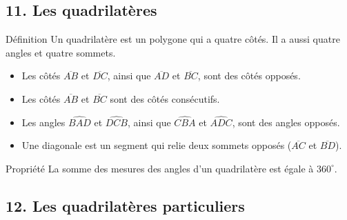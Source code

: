 \newpage
\subsection*{11. Les quadrilatères}

\begin{regle}{Définition}
Un \textcolor{themeColor}{quadrilatère} est un \textcolor{themeColor}{polygone} qui a quatre côtés. Il a aussi quatre angles et quatre sommets.
\end{regle}

\begin{center}
\end{center}

\begin{itemize}[leftmargin=*, itemsep=2pt, topsep=2pt, label=$\triangleright$]
    \item Les côtés $\overline{AB}$ et $\overline{DC}$, ainsi que $\overline{AD}$ et $\overline{BC}$, sont des \textcolor{themeColor}{côtés opposés}.
    \item Les côtés $\overline{AB}$ et $\overline{BC}$ sont des \textcolor{themeColor}{côtés consécutifs}.
    \item Les angles $\widehat{BAD}$ et $\widehat{DCB}$, ainsi que $\widehat{CBA}$ et $\widehat{ADC}$, sont des \textcolor{themeColor}{angles opposés}.
    \item Une \textcolor{themeColor}{diagonale} est un segment qui relie deux sommets opposés ($\overline{AC}$ et $\overline{BD}$).
\end{itemize}

\begin{regle}{Propriété}
La somme des mesures des angles d'un quadrilatère est égale à \textcolor{themeColor}{$360^\circ$}.
\end{regle}

\vfill
\subsection*{12. Les quadrilatères particuliers}

